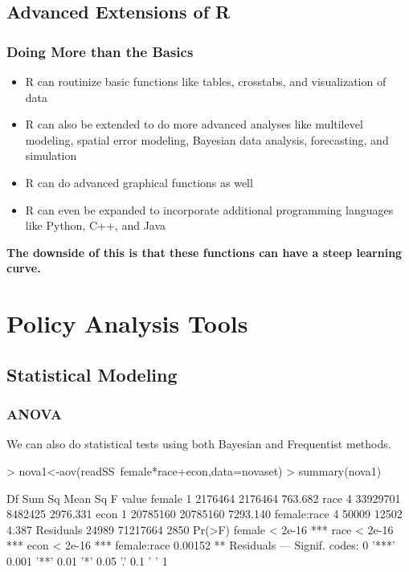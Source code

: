 \documentclass[12pt,handout]{beamer}
\begin{document}
\subsection{Advanced Extensions of R}
\begin{frame}
\frametitle{Doing More than the Basics}
  \begin{itemize}
  \item R can routinize basic functions like tables, crosstabs, and visualization of data
  \item R can also be extended to do more advanced analyses like multilevel modeling, spatial error modeling, Bayesian data analysis, forecasting, and simulation
  \item R can do advanced graphical functions as well
  \item R can even be expanded to incorporate additional programming languages like Python, C++, and Java
  \end{itemize}
\textbf{The downside of this is that these functions can have a steep learning curve.}
\end{frame}

\section{Policy Analysis Tools}
\subsection{Statistical Modeling}

\begin{frame}[containsverbatim]
\frametitle{ANOVA}
We can also do statistical tests using both Bayesian and Frequentist methods.
\begin{Schunk}
\begin{Sinput}
> nova1<-aov(readSS~female*race+econ,data=novaset)
> summary(nova1)
\end{Sinput}
\begin{Soutput}
               Df   Sum Sq  Mean Sq  F value
female          1  2176464  2176464  763.682
race            4 33929701  8482425 2976.331
econ            1 20785160 20785160 7293.140
female:race     4    50009    12502    4.387
Residuals   24989 71217664     2850         
             Pr(>F)    
female      < 2e-16 ***
race        < 2e-16 ***
econ        < 2e-16 ***
female:race 0.00152 ** 
Residuals              
---
Signif. codes:  0 '***' 0.001 '**' 0.01 '*' 0.05 '.' 0.1 ' ' 1 
\end{Soutput}
\end{Schunk}
\end{frame}
\end{document}
